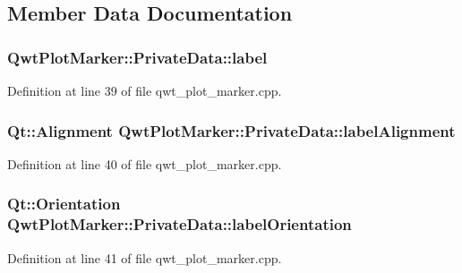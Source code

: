 \subsection{Member Data Documentation}
\hypertarget{class_qwt_plot_marker_1_1_private_data_a4a92617323c56acd7b3dab1fc41ffa88}{
\subsubsection[{label}]{ Qwt\-Plot\-Marker\-::\-Private\-Data\-::label}}\label{class_qwt_plot_marker_1_1_private_data_a4a92617323c56acd7b3dab1fc41ffa88}


Definition at line 39 of file qwt\-\_\-plot\-\_\-marker.\-cpp.

\hypertarget{class_qwt_plot_marker_1_1_private_data_ae9af76b53cb9669ff3901691eb676ccb}{
\subsubsection[{label\-Alignment}]{\setlength{\rightskip}{0pt plus 5cm}Qt\-::\-Alignment Qwt\-Plot\-Marker\-::\-Private\-Data\-::label\-Alignment}}\label{class_qwt_plot_marker_1_1_private_data_ae9af76b53cb9669ff3901691eb676ccb}


Definition at line 40 of file qwt\-\_\-plot\-\_\-marker.\-cpp.

\hypertarget{class_qwt_plot_marker_1_1_private_data_ad197cdd34ddfd60019f05f499ef91d32}{
\subsubsection[{label\-Orientation}]{\setlength{\rightskip}{0pt plus 5cm}Qt\-::\-Orientation Qwt\-Plot\-Marker\-::\-Private\-Data\-::label\-Orientation}}\label{class_qwt_plot_marker_1_1_private_data_ad197cdd34ddfd60019f05f499ef91d32}


Definition at line 41 of file qwt\-\_\-plot\-\_\-marker.\-cpp.

